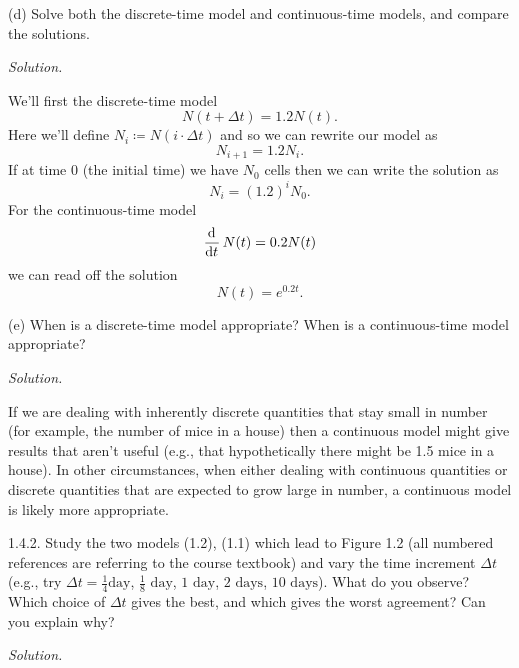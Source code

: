 \documentclass{article}
\begin{document}
(d) Solve both the discrete-time model and continuous-time models, and
compare the solutions.

\textit{Solution.}

We'll first the discrete-time model
%
\begin{equation*}
    N(t + \Delta t) = 1.2 N(t)
    .
\end{equation*}
%
Here we'll define $N_i \coloneqq N(i \cdot \Delta t)$ and so we can rewrite
our model as
%
\begin{equation*}
    N_{i + 1} = 1.2 N_i
    .
\end{equation*}
%
If at time 0 (the initial time) we have $N_0$ cells then we can write
the solution as
%
\begin{equation*}
    N_i = (1.2)^i N_0
    .
\end{equation*}
%
For the continuous-time model
%
\begin{equation*}
    \dod{}{t} N(t) = 0.2 N(t)
\end{equation*}
%
we can read off the solution
%
\begin{equation*}
    N(t) = e^{0.2 t}
    .
\end{equation*}

\newpage

(e) When is a discrete-time model appropriate? When is a continuous-time
model appropriate?

\textit{Solution.}

If we are dealing with inherently discrete quantities that stay small in
number (for example, the number of mice in a house) then a continuous
model might give results that aren't useful (e.g., that hypothetically
there might be 1.5 mice in a house). In other circumstances, when either
dealing with continuous quantities or discrete quantities that are
expected to grow large in number, a continuous model is likely more
appropriate.

\newpage

1.4.2. Study the two models (1.2), (1.1) which lead to Figure 1.2 (all
  numbered references are referring to the course textbook) and vary the
  time increment $\Delta t$ (e.g., try $\Delta t = \frac{1}{4} \text{
  day}$, $\frac{1}{8} \text{ day}$, $1 \text{ day}$, $2 \text{ days}$,
  $10 \text{ days}$). What do you observe? Which choice of $\Delta t$
  gives the best, and which gives the worst agreement? Can you explain
  why?

\textit{Solution.}
\end{document}
